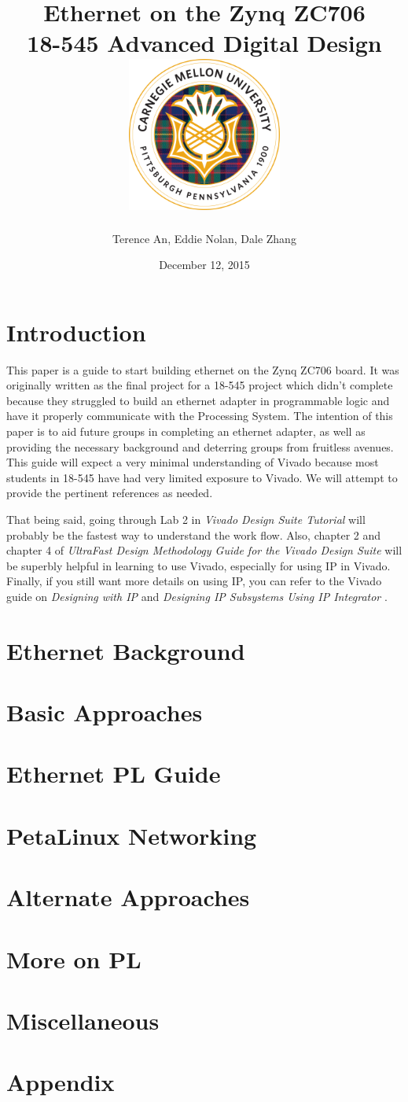 \documentclass[12pt]{report}
\title{
  {Ethernet on the Zynq ZC706 \vspace{0.2in}}\\
  {\large 18-545 Advanced Digital Design \vspace{0.2in}}\\
  {\includegraphics[width=2in]{cmu_seal.png}}
}
\author{Terence An, Eddie Nolan, Dale Zhang}
\date{December 12, 2015}
\begin{document}
\maketitle

\chapter{Introduction}
This paper is a guide to start building ethernet on the Zynq ZC706 board. It was originally written as the final project for a 18-545 project which didn't complete because they struggled to build an ethernet adapter in programmable logic and have it properly communicate with the Processing System. The intention of this paper is to aid future groups in completing an ethernet adapter, as well as providing the necessary background and deterring groups from fruitless avenues. This guide will expect a very minimal understanding of Vivado because most students in 18-545 have had very limited exposure to Vivado. We will attempt to provide the pertinent references as needed.

That being said, going through Lab 2 in \textit{Vivado Design Suite Tutorial} \cite{vivado_tut} will probably be the fastest way to understand the work flow. Also, chapter 2 and chapter 4 of \textit{UltraFast Design Methodology Guide for the Vivado Design Suite} \cite{ultrafast} will be superbly helpful in learning to use Vivado, especially for using IP in Vivado. Finally, if you still want more details on using IP, you can refer to the Vivado guide on \textit{Designing with IP} \cite{IP} and \textit{Designing IP Subsystems Using IP Integrator} \cite{IP_subsystems}.


\chapter{Ethernet Background}

\chapter{Basic Approaches}

\chapter{Ethernet PL Guide}

\chapter{PetaLinux Networking}

\chapter{Alternate Approaches}

\chapter{More on PL}

\chapter{Miscellaneous}

\printbibliography

\appendix
\chapter{Appendix}
\end{document}

